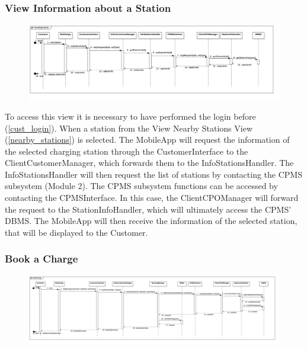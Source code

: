 \subsubsection{View Information about a Station}
\begin{figure}[H]
    \begin{center}
        \includegraphics[width=\textwidth]{img/runtime/station_info}
    \end{center}
\end{figure}
To access this view it is necessary to have performed the login before (\ref{cust_login}). When a station from the View Nearby Stations View (\ref{nearby_stations}) is selected. The MobileApp will request the information of the selected charging station through the CustomerInterface to the ClientCustomerManager, which forwards them to the InfoStationsHandler. The InfoStationsHandler will then request the list of stations by contacting the CPMS subsystem (Module 2). The CPMS subsystem functions can be accessed by contacting the CPMSInterface. In this case, the ClientCPOManager will forward the request to the StationInfoHandler, which will ultimately access the CPMS' DBMS. The MobileApp will then receive the information of the selected station, that will be displayed to the Customer.
\subsubsection{Book a Charge}
\begin{figure}[H]
    \begin{center}
        \includegraphics[width=\textwidth]{img/runtime/book_charge}
    \end{center}
\end{figure}
